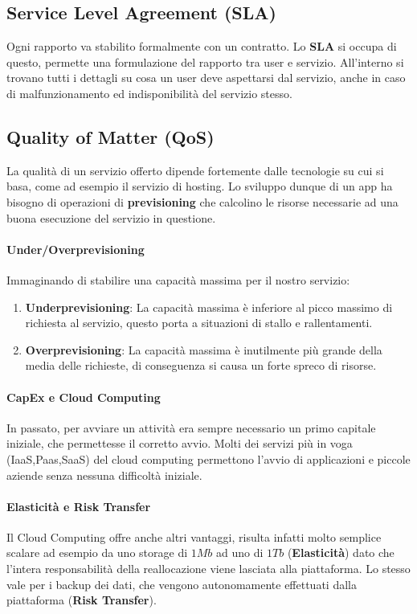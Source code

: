 \documentclass{article}
\begin{document}
\subsection{Service Level Agreement (SLA)}

Ogni rapporto va stabilito formalmente con un contratto. Lo \textbf{SLA} si occupa di questo, permette una formulazione del rapporto tra user e servizio. All'interno si trovano tutti i dettagli su cosa un user deve aspettarsi dal servizio, anche in caso di malfunzionamento ed indisponibilità del servizio stesso.

\subsection{Quality of Matter (QoS)}

La qualità di un servizio offerto dipende fortemente dalle tecnologie su cui si basa, come ad esempio il servizio di hosting. Lo sviluppo dunque di un app ha bisogno di operazioni di \textbf{previsioning} che calcolino le risorse necessarie ad una buona esecuzione del servizio in questione.

\paragraph{Under/Overprevisioning}

Immaginando di stabilire una capacità massima per il nostro servizio:

\begin{enumerate}
    \item \textbf{Underprevisioning}: La capacità massima è inferiore al picco massimo di richiesta al servizio, questo porta a situazioni di stallo e rallentamenti.
    \item \textbf{Overprevisioning}: La capacità massima è inutilmente più grande della media delle richieste, di conseguenza si causa un forte spreco di risorse.
\end{enumerate}

\paragraph{CapEx e Cloud Computing} In passato, per avviare un attività era sempre necessario un primo capitale iniziale, che permettesse il corretto avvio. Molti dei servizi più in voga (IaaS,Paas,SaaS) del cloud computing permettono l'avvio di applicazioni e piccole aziende senza nessuna difficoltà iniziale.

\paragraph{Elasticità e Risk Transfer} Il Cloud Computing offre anche altri vantaggi, risulta infatti molto semplice scalare ad esempio da uno storage di $1Mb$ ad uno di $1Tb$ (\textbf{Elasticità}) dato che l'intera responsabilità della reallocazione viene lasciata alla piattaforma. Lo stesso vale per i backup dei dati, che vengono autonomamente effettuati dalla piattaforma (\textbf{Risk Transfer}).
\end{document}
